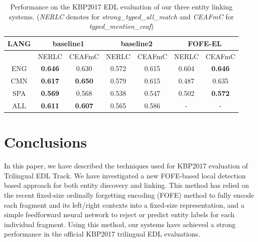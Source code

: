 \documentclass[11pt]{article}
\begin{document}
\begin{table}
\centering
\begin{tabular}{|c|c|c|c|c|c|c|}  \hline
LANG  &  \multicolumn{2}{|c|}{baseline1} & \multicolumn{2}{|c|}{baseline2} &  \multicolumn{2}{|c|}{FOFE-EL} \\ \hline
 &  NERLC  & CEAFmC  &  NERLC  & CEAFmC &  NERLC  & CEAFmC \\ \hline
ENG &  {\bf 0.646} & 0.630 &  0.572 & 0.615 & 0.604 & {\bf 0.646} \\
CMN  &  {\bf 0.617} & {\bf 0.650} & 0.579 & 0.615 & 0.487 & 0.635 \\	
SPA  & {\bf 0.569} & 0.568 & 0.538 & 0.547 & 0.502 & {\bf 0.572}  \\ \hline
ALL  & {\bf 0.611} & {\bf 0.607} & 0.565 & 0.586 & - & - \\ \hline
\end{tabular}
\caption{Performance on the KBP2017 EDL evaluation of our three entity linking systems. ({\em NERLC} denotes for {\em strong\_typed\_all\_match} and {\em CEAFmC} for {\em typed\_mention\_ceaf}) } 
\label{tbl:kbp2017-entity-linking}	
\end{table}

\section{Conclusions}

In this paper, we have described the techniques used for KBP2017 evaluation of Trilingual EDL Track. We have investigated a new FOFE-based local detection based approach for both entity discovery and linking. This method has relied on the recent fixed-size ordinally forgetting encoding (FOFE) method to fully encode each fragment and its left/right contexts into a fixed-size representation, and a simple feedforward neural network to reject or predict entity labels for each individual fragment. Using this method, our systems have achieved a strong performance in the official KBP2017 trilingual EDL evaluations. 



\end{document}
